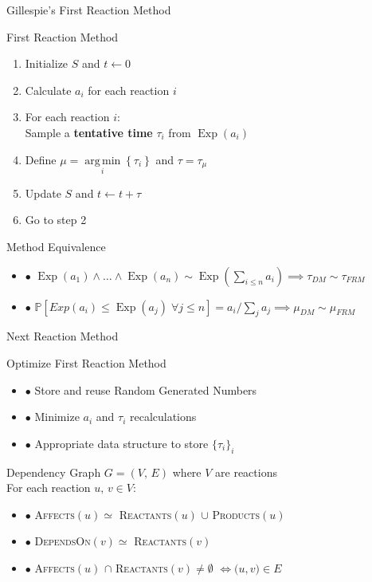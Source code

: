\documentclass{beamer}
\DeclareMathOperator{\Exp}{\text{Exp}}
\DeclareMathOperator*{\argmin}{arg\,min}
\begin{document}
\begin{frame}{Gillespie's First Reaction Method}
  \begin{block}{First Reaction Method}
    \begin{enumerate}
    \item Initialize $S$ and $t\leftarrow 0$ 
    \item Calculate $a_i$ for each reaction $i$
    \item For each reaction $i$: \\
       Sample a \textbf{tentative time} $\tau_i$ from $\Exp\left(a_i\right)$  
    \item Define $\mu = \argmin\limits_i\left\{\tau_i\right\}$ and $\tau = \tau_\mu$
    \item Update $S$ and $t \leftarrow t + \tau$
    \item Go to step 2
    \end{enumerate}
  \end{block}
  \begin{block}{Method Equivalence}
    \begin{itemize}
    \item $\bullet$ $\Exp(a_1) \land \dots \land \Exp(a_n) \sim
      \Exp\left(\sum_{i\leq n} a_i\right) \implies \tau_{DM}  \sim \tau_{FRM}$
    \item $\bullet$ $\mathbb{P}\left[Exp(a_i) \leq \Exp(a_j) \;
        \forall j \leq n \right] = a_i \big/\sum_ja_j \implies \mu_{DM} \sim \mu_{FRM}$
    \end{itemize}
  \end{block}
\end{frame}

\begin{frame}{Next Reaction Method}
  \begin{block}{Optimize First Reaction Method}
    \begin{itemize}
    \item $\bullet$ Store and reuse Random Generated Numbers
    \item $\bullet$ Minimize $a_i$ and $\tau_i$ recalculations
    \item $\bullet$ Appropriate data structure to store $\bigl\{\tau_i\bigr\}_i$
    \end{itemize}
  \end{block}
  \begin{block}{Dependency Graph}
    $G=\left(V,\, E\right)$ where $V$ are reactions \\
    \vspace{2pt}
    For each reaction $u,\, v \in V$:
    \begin{itemize}
    \item $\bullet$ \textsc{Affects}$(u) \simeq $ \textsc{Reactants}$(u)$ $\cup$ \textsc{Products}$(u)$
    \item $\bullet$ \textsc{DependsOn}$(v) \simeq $ \textsc{Reactants}$(v)$
    \item $\bullet$ \textsc{Affects}$(u)$ $\cap$
      \textsc{Reactants}$(v) \neq \emptyset$ $\iff \bigl(u, v \bigr) \in E$   
    \end{itemize}    
  \end{block}
\end{frame}
\end{document}
